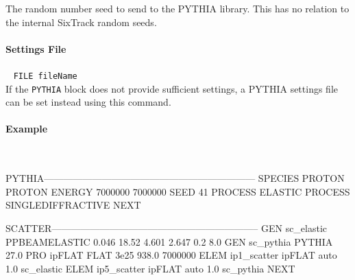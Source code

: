 The random number seed to send to the PYTHIA library.
This has no relation to the internal SixTrack random seeds.

\paragraph{Settings File}~ \texttt{FILE fileName}\\

If the \texttt{PYTHIA} block does not provide sufficient settings, a PYTHIA settings file can be set instead using this command.

\paragraph{Example}~\\
\begin{cverbatim}
PYTHIA------------------------------------------------------------------
  SPECIES PROTON PROTON
  ENERGY 7000000 7000000
  SEED 41
  PROCESS ELASTIC
  PROCESS SINGLEDIFFRACTIVE
NEXT

SCATTER-----------------------------------------------------------------
  GEN  sc_elastic  PPBEAMELASTIC 0.046  18.52  4.601  2.647  0.2  8.0
  GEN  sc_pythia   PYTHIA  27.0
  PRO  ipFLAT      FLAT   3e25  938.0  7000000
  ELEM ip1_scatter ipFLAT auto 1.0 sc_elastic
  ELEM ip5_scatter ipFLAT auto 1.0 sc_pythia
NEXT
\end{cverbatim}
